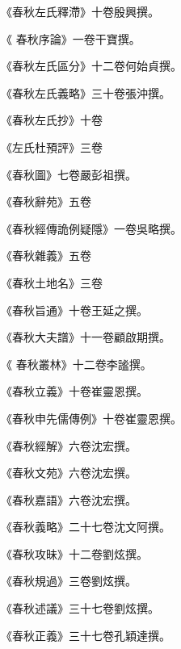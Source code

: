 \begin{pinyinscope}
 《春秋左氏釋滯》十卷殷興撰。



 《
 春秋序論》一卷干寶撰。



 《春秋左氏區分》十二卷何始貞撰。



 《春秋左氏義略》三十卷張沖撰。



 《春秋左氏抄》十卷



 《左氏杜預評》三卷



 《春秋圖》七卷嚴彭祖撰。



 《春秋辭苑》五卷



 《春秋經傳詭例疑隱》一卷吳略撰。



 《春秋雜義》五卷



 《春秋土地名》三卷



 《春秋旨通》十卷王延之撰。



 《春秋大夫譜》十一卷顧啟期撰。



 《
 春秋叢林》十二卷李謐撰。



 《春秋立義》十卷崔靈恩撰。



 《春秋申先儒傳例》十卷崔靈恩撰。



 《春秋經解》六卷沈宏撰。



 《春秋文苑》六卷沈宏撰。



 《春秋嘉語》六卷沈宏撰。



 《春秋義略》二十七卷沈文阿撰。



 《春秋攻昧》十二卷劉炫撰。



 《春秋規過》三卷劉炫撰。



 《春秋述議》三十七卷劉炫撰。



 《春秋正義》三十七卷孔穎達撰。




\end{pinyinscope}
